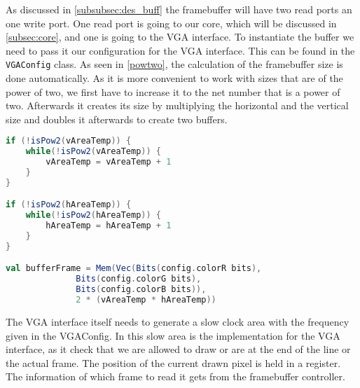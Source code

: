 As discussed in \cref{subsubsec:des_buff} the framebuffer will have two read ports an one write port. One read port is going to our core, which will be discussed in \cref{subsec:core}, and one is going to the VGA interface. To instantiate the buffer we need to pass it our configuration for the VGA interface. This can be found in the \texttt{VGAConfig} class. As seen in \cref{powtwo}, the calculation of the framebuffer size is done automatically. As it is more convenient to work with sizes that are of the power of two, we first have to increase it to the net number that is a power of two. Afterwards it creates its size by multiplying the horizontal and the vertical size and doubles it afterwards to create two buffers. 
\begin{lstlisting}[language=scala, caption={Resolution Check}, label=powtwo]
if (!isPow2(vAreaTemp)) {
	while(!isPow2(vAreaTemp)) {
		vAreaTemp = vAreaTemp + 1
	}
}

if (!isPow2(hAreaTemp)) {
	while(!isPow2(hAreaTemp)) {
		hAreaTemp = hAreaTemp + 1
	}
}

val bufferFrame = Mem(Vec(Bits(config.colorR bits), 
			  Bits(config.colorG bits), 
			  Bits(config.colorB bits)), 
			  2 * (vAreaTemp * hAreaTemp))
\end{lstlisting}
The VGA interface itself needs to generate a slow clock area with the frequency given in the VGAConfig. In this slow area is the implementation for the VGA interface, as it check that we are allowed to draw or are at the end of the line or the actual frame. The position of the current drawn pixel is held in a register. The information of which frame to read it gets from the framebuffer controller.
